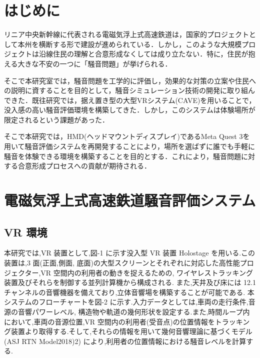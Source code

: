 \documentclass[10pt]{jsarticle}
\begin{document}

\section{はじめに}
リニア中央新幹線に代表される電磁気浮上式高速鉄道は，国家的プロジェクトとして本州を横断する形で建設が進められている．しかし，このような大規模プロジェクトは沿線住民の理解と合意形成なくしては成り立たない．特に，住民が抱える大きな不安の一つに「騒音問題」が挙げられる．

そこで本研究室では，騒音問題を工学的に評価し，効果的な対策の立案や住民への説明に資することを目的として，騒音シミュレーション技術の開発に取り組んできた．既往研究では，据え置き型の大型VRシステム(CAVE)を用いることで，没入感の高い騒音評価環境を構築してきた．しかし，このシステムは体験場所が限定されるという課題があった．

そこで本研究では，HMD(ヘッドマウントディスプレイ)であるMeta Quest 3を用いて騒音評価システムを再開発することにより，場所を選ばずに誰でも手軽に騒音を体験できる環境を構築することを目的とする．これにより，騒音問題に対する合意形成プロセスへの貢献が期待される．

\section{電磁気浮上式高速鉄道騒音評価システム}
\subsection{VR 環境}
本研究では,VR 装置として,図-1 に示す没入型 VR 装置 Holostage を用いる.この装置は,3 面(正面,側面, 底面)の大型スクリーンとそれぞれに対応した高性能プロジェクター,VR 空間内の利用者の動きを捉えるための, ワイヤレストラッキング装置及びそれらを制御する並列計算機から構成される. また,天井及び床には 12.1 チャンネルの音響機器を備えており,立体音響場を構築することが可能である.
本システムのフローチャートを図-2 に示す.入力データとしては,車両の走行条件,音源の音響パワーレベル, 構造物や軌道の幾何形状を設定する.また,時間ループ内において,車両の音源位置,VR 空間内の利用者(受音点)の位置情報をトラッキング装置より取得する.そして,それらの情報を用いて幾何音響理論に基づくモデル(ASJ RTN Model2018)2) により,利用者の位置情報における騒音レベルを計算する.
\end{document}
